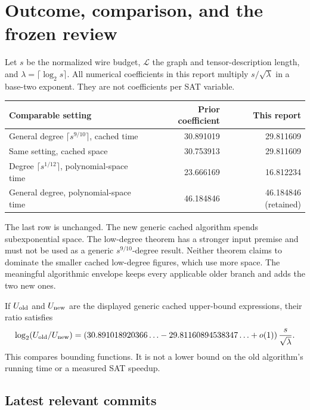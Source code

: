 \section{Outcome, comparison, and the frozen review}
\label{sec:review}

Let $s$ be the normalized wire budget, $\mathcal L$ the graph and
tensor-description length, and $\lambda=\lceil\log_2s\rceil$.
All numerical coefficients in this report multiply $s/\sqrt\lambda$ in a
base-two exponent. They are not coefficients per SAT variable.

\begin{center}\small
\begin{tabular}{p{7.7cm}rr}
\toprule Comparable setting & Prior coefficient & This report\\\midrule
General degree $\lceil s^{9/10}\rceil$, cached time &30.891019&29.811609\\
Same setting, cached space &30.753913&29.811609\\
Degree $\lceil s^{1/12}\rceil$, polynomial-space time &23.666169&16.812234\\
General degree, polynomial-space time &46.184846&46.184846 (retained)\\
\bottomrule
\end{tabular}\end{center}

The last row is unchanged. The new generic cached algorithm spends
subexponential space. The low-degree theorem has a stronger input premise
and must not be used as a generic $s^{9/10}$-degree result. Neither theorem
claims to dominate the smaller cached low-degree figures, which use more
space. The meaningful algorithmic envelope keeps every applicable older
branch and adds the two new ones.

If $U_{\rm old}$ and $U_{\rm new}$ are the displayed generic cached
upper-bound expressions, their ratio satisfies
\[
 \log_2(U_{\rm old}/U_{\rm new})
 =\left(30.891018920366\ldots-29.81160894538347\ldots+o(1)\right)
   \frac{s}{\sqrt\lambda}.
\]
This compares bounding functions. It is not a lower bound on the old
algorithm's running time or a measured SAT speedup.

\subsection{Latest relevant commits}

